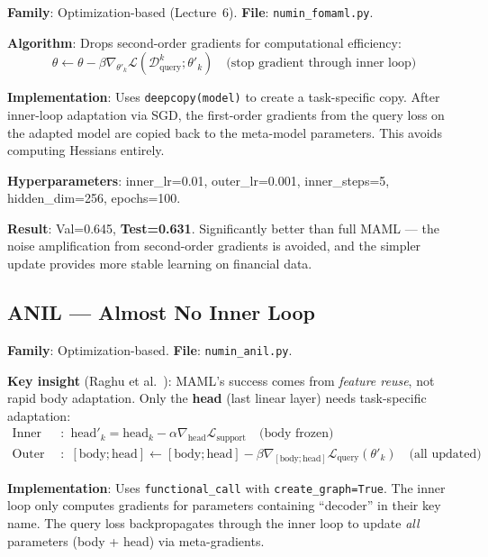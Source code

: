 \documentclass[11pt,a4paper]{article}
\begin{document}
\textbf{Family}: Optimization-based (Lecture~6). \textbf{File}: \texttt{numin\_fomaml.py}.

\textbf{Algorithm}: Drops second-order gradients for computational efficiency:
\begin{equation}
  \theta \leftarrow \theta - \beta \nabla_{\theta'_k} \mathcal{L}(\mathcal{D}_{\text{query}}^k; \theta'_k) \quad \text{(stop gradient through inner loop)}
\end{equation}

\textbf{Implementation}: Uses \texttt{deepcopy(model)} to create a task-specific copy. After inner-loop adaptation via SGD, the first-order gradients from the query loss on the adapted model are copied back to the meta-model parameters. This avoids computing Hessians entirely.

\textbf{Hyperparameters}: inner\_lr=0.01, outer\_lr=0.001, inner\_steps=5, hidden\_dim=256, epochs=100.

\textbf{Result}: Val=0.645, \textbf{Test=0.631}. Significantly better than full MAML --- the noise amplification from second-order gradients is avoided, and the simpler update provides more stable learning on financial data.

\subsection{ANIL --- Almost No Inner Loop~\cite{raghu2020}}

\textbf{Family}: Optimization-based. \textbf{File}: \texttt{numin\_anil.py}.

\textbf{Key insight} (Raghu et al.~\cite{raghu2020}): MAML's success comes from \emph{feature reuse}, not rapid body adaptation. Only the \textbf{head} (last linear layer) needs task-specific adaptation:
\begin{align}
  \text{Inner loop}: \quad & \text{head}'_k = \text{head}_k - \alpha \nabla_{\text{head}} \mathcal{L}_{\text{support}} \quad \text{(body frozen)} \\
  \text{Outer loop}: \quad & [\text{body}; \text{head}] \leftarrow [\text{body}; \text{head}] - \beta \nabla_{[\text{body};\text{head}]} \mathcal{L}_{\text{query}}(\theta'_k) \quad \text{(all updated)}
\end{align}

\textbf{Implementation}: Uses \texttt{functional\_call} with \texttt{create\_graph=True}. The inner loop only computes gradients for parameters containing ``decoder'' in their key name. The query loss backpropagates through the inner loop to update \emph{all} parameters (body + head) via meta-gradients.
\end{document}
